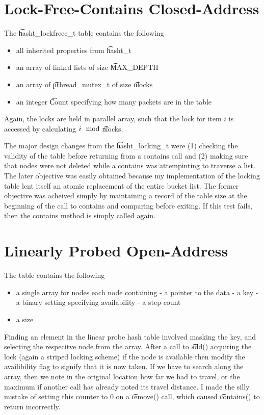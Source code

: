 \section{Lock-Free-Contains Closed-Address}


The \t{hasht\_lockfreec\_t} table contains the following
\begin{itemize}
\item all inherited properties from \t{hasht\_t}
\item an array of linked lists of size \t{MAX\_DEPTH}
\item an array of \t{pthread\_mutex\_t} of size \t{nlocks}
\item an integer \t{Count} specifying how many packets are in the table
\end{itemize}

Again, the locks are held in parallel array, such that the lock for
item $i$ is accessed by calculating $i \mod$\t{nlocks}.

The major design changes from the \t{hasht\_locking\_t} were (1)
checking the validity of the table before returning from a contains
call and (2) making sure that nodes were not deleted while a contains
was attempinting to traverse a list.  The later objective was easily
obtained because my implementation of the locking table lent itself an
atomic replacement of the entire bucket list.  The former objective
was acheived simply by maintaining a record of the table size at the
beginning of the call to contains and comparing before exiting.  If
this test fails, then the contains method is simply called again.

\section{Linearly Probed Open-Address}

The table contains the following
\begin{itemize}
\item a single array for nodes each node containing
\subitem  - a pointer to the data
\subitem  - a key
\subitem  - a binary setting specifying availability
\subitem  - a step count
\item a size
\end{itemize}

Finding an element in the linear probe hash table involved masking the
key, and selecting the respecitve node from the array.  After a call
to \t{add()} acquiring the lock (again a striped locking scheme) if
the node is available then modify the availibility flag to signify
that it is now taken. If we have to search along the array, then we
note in the original location how far we had to travel, or the maximum
if another call has already noted its travel distance. I made the
silly mistake of setting this counter to 0 on a \t{remove()} call,
which caused \t{contains()} to return incorrectly.

